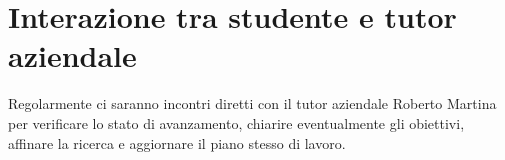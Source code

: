 \section{Interazione tra studente e tutor aziendale}

Regolarmente ci saranno incontri diretti con il tutor aziendale Roberto Martina per verificare lo stato di avanzamento, 
chiarire eventualmente gli obiettivi, affinare la ricerca e aggiornare il piano stesso di lavoro.